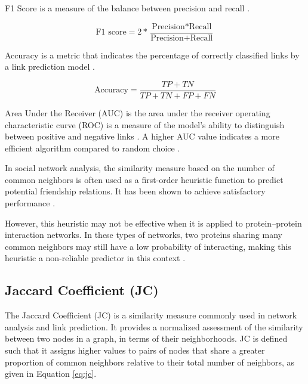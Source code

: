 F1 Score is a measure of the balance between precision and recall \cite{arrar2023comprehensive}.

\begin{equation}
\label{eq:f1score}
  \text{F1 score} = 2 * \frac{\text{Precision} * \text{Recall}}{\text{Precision} + \text{Recall}}
\end{equation}

Accuracy is a metric that indicates the percentage of correctly classified links by a link prediction model \cite{arrar2023comprehensive}.

\begin{equation}
\label{eq:accuracy}
  \text{Accuracy} = \frac{TP + TN}{TP + TN + FP + FN}
\end{equation}

Area Under the Receiver (AUC) \cite{hanley1982meaning} is the area under the receiver operating characteristic curve (ROC) is a measure of the model’s ability to distinguish between positive and negative links \cite{arrar2023comprehensive}. A higher AUC value indicates a more efficient algorithm compared to random choice \cite{mumin2022efficient}. 


In social network analysis, the similarity measure based on the number of common neighbors is often used as a first-order heuristic function to predict potential friendship relations. It has been shown to achieve satisfactory performance \cite{arrar2023comprehensive}.

However, this heuristic may not be effective when it is applied to protein–protein interaction networks. In these types of networks, two proteins sharing many common neighbors may still have a low probability of interacting, making this heuristic a non-reliable predictor in this context \cite{arrar2023comprehensive}.



\subsection{Jaccard Coefficient (JC)}

The Jaccard Coefficient (JC) \cite{jaccard1901etude} is a similarity measure commonly used in network analysis and link prediction. It provides a normalized assessment of the similarity between two nodes in a graph, in terms of their neighborhoods. JC is defined such that it assigns higher values to pairs of nodes that share a greater proportion of common neighbors relative to their total number of neighbors, as given in Equation \ref{eq:jc}.

